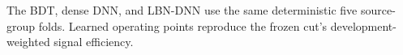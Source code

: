 The BDT, dense DNN, and LBN-DNN use the same deterministic five source-group folds. Learned operating points reproduce the frozen cut's development-weighted signal efficiency.
